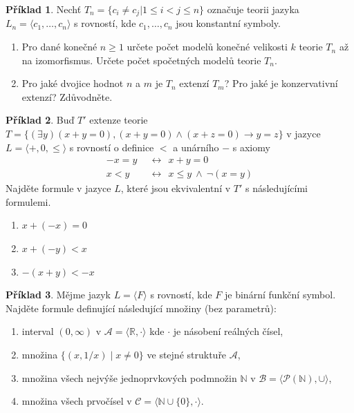\documentclass[a4paper]{article}
\theoremstyle{definition}
\newtheorem{problem}{Příklad}
\begin{document}
\medskip\begin{problem}
Nechť $T_n = \{c_i \neq c_j | 1 \leq i < j \leq n\}$ označuje teorii jazyka $L_n = \langle c_1, \dots, c_n \rangle$ s rovností, kde $c_1, \dots, c_n$ jsou konstantní symboly.
\begin{enumerate}    
    \item Pro dané konečné $n \geq 1$ určete počet modelů konečné velikosti $k$ teorie $T_n$ až na izomorfismus. Určete počet spočetných modelů teorie $T_n$. 
    \item Pro jaké dvojice hodnot $n$ a $m$ je $T_n$ extenzí $T_m$? Pro jaké je konzervativní extenzí? Zdůvodněte.
\end{enumerate}
\end{problem}


\medskip\begin{problem}
Buď $T'$ extenze teorie $T=\{(\exists y)(x+y=0),(x+y=0)\wedge (x+z=0)\rightarrow y=z\}$ v jazyce $L=\langle +,0,\le\rangle$ s rovností o definice $<$ a unárního $-$ s axiomy
\begin{align*}
    -x=y\ \ &\leftrightarrow\ \ x+y=0\\
    x<y\ \ &\leftrightarrow\ \ x\le y\ \wedge\ \neg(x=y)
\end{align*}
Najděte formule v jazyce $L$, které jsou ekvivalentní v $T'$ s následujícími formulemi.
\begin{enumerate}    
    \item $x+(-x)=0$
    \item $x+(-y)<x$
    \item $-(x+y)<-x$
\end{enumerate}
\end{problem}


\medskip\begin{problem}
Mějme jazyk $L=\langle F \rangle$ s rovností, kde $F$ je binární funkční symbol. Najděte formule definující následující množiny (bez parametrů):
\begin{enumerate}
    \item interval $(0,\infty)$ v $\mathcal A=\langle\mathbb R, \cdot\rangle$ kde $\cdot$ je násobení reálných čísel,
    \item množina $\{(x, 1/x)\mid x\neq 0\}$ ve stejné struktuře $\mathcal A$,
    \item množina všech nejvýše jednoprvkových podmnožin $\mathbb N$ v $\mathcal B=\langle\mathcal P(\mathbb N),\cup\rangle$,
    \item množina všech prvočísel v $\mathcal C=\langle \mathbb N\cup\{0\}, \cdot\rangle$.
\end{enumerate}
\end{problem}
\end{document}

